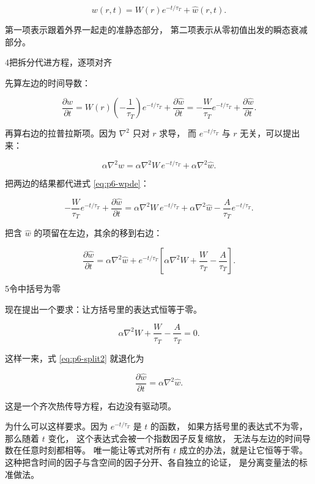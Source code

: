 \begin{equation}
w(r,t)=W(r)e^{-t/\tau_T}+\hat w(r,t).
\label{eq:p6-split}
\end{equation}

第一项表示跟着外界一起走的准静态部分，
第二项表示从零初值出发的瞬态衰减部分。

\begin{stepbox}{4}{把拆分代进方程，逐项对齐}

先算左边的时间导数：

\begin{equation}
\frac{\partial w}{\partial t}
=W(r)\left(-\frac{1}{\tau_T}\right)e^{-t/\tau_T}+\frac{\partial \hat w}{\partial t}
=-\frac{W}{\tau_T}e^{-t/\tau_T}+\frac{\partial \hat w}{\partial t}.
\end{equation}

再算右边的拉普拉斯项。因为 $\nabla^2$ 只对 $r$ 求导，
而 $e^{-t/\tau_T}$ 与 $r$ 无关，可以提出来：

\begin{equation}
\alpha\nabla^2 w=\alpha\nabla^2 W\,e^{-t/\tau_T}+\alpha\nabla^2\hat w .
\end{equation}

把两边的结果都代进式 \eqref{eq:p6-wpde}：

\begin{equation}
-\frac{W}{\tau_T}e^{-t/\tau_T}+\frac{\partial\hat w}{\partial t}
=\alpha\nabla^2W\,e^{-t/\tau_T}+\alpha\nabla^2\hat w-\frac{A}{\tau_T}e^{-t/\tau_T}.
\end{equation}

把含 $\hat w$ 的项留在左边，其余的移到右边：

\begin{equation}
\frac{\partial\hat w}{\partial t}
=\alpha\nabla^2\hat w
+e^{-t/\tau_T}\left[\alpha\nabla^2W+\frac{W}{\tau_T}-\frac{A}{\tau_T}\right].
\label{eq:p6-split2}
\end{equation}

\end{stepbox}

\begin{stepbox}{5}{令中括号为零}

现在提出一个要求：让方括号里的表达式恒等于零。

\begin{equation}
\alpha\nabla^2W+\frac{W}{\tau_T}-\frac{A}{\tau_T}=0 .
\label{eq:p6-Wode}
\end{equation}

这样一来，式 \eqref{eq:p6-split2} 就退化为

\begin{equation}
\frac{\partial\hat w}{\partial t}=\alpha\nabla^2\hat w .
\label{eq:p6-What}
\end{equation}

这是一个齐次热传导方程，右边没有驱动项。

为什么可以这样要求。因为 $e^{-t/\tau_T}$ 是 $t$ 的函数，
如果方括号里的表达式不为零，那么随着 $t$ 变化，
这个表达式会被一个指数因子反复缩放，
无法与左边的时间导数在任意时刻都相等。
唯一能让等式对所有 $t$ 成立的办法，就是让它恒等于零。
这种把含时间的因子与含空间的因子分开、各自独立的论证，
是分离变量法的标准做法。

\end{stepbox}

